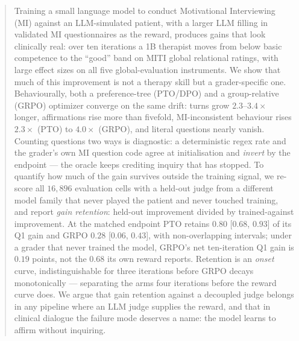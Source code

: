 \begin{abstract}
Training a small language model to conduct Motivational Interviewing (MI) against an
LLM-simulated patient, with a larger LLM filling in validated MI questionnaires as the
reward, produces gains that look clinically real: over ten iterations a 1B therapist moves
from below basic competence to the ``good'' band on MITI global relational ratings, with
large effect sizes on all five global-evaluation instruments. We show that much of this
improvement is not a therapy skill but a grader-specific one. Behaviourally, both a
preference-tree (PTO/DPO) and a group-relative (GRPO) optimizer converge on the same drift:
turns grow $2.3$--$3.4\times$ longer, affirmations rise more than fivefold, MI-inconsistent
behaviour rises $2.3\times$ (PTO) to $4.0\times$ (GRPO), and literal questions nearly vanish.
Counting questions two ways is diagnostic: a deterministic regex rate and the grader's own MI
question code agree at initialisation and \emph{invert} by the endpoint --- the oracle keeps
crediting inquiry that has stopped. To
quantify how much of the gain survives outside the training signal, we re-score all
$16{,}896$ evaluation cells with a held-out judge from a different model family that never
played the patient and never touched training, and report \emph{gain retention}: held-out
improvement divided by trained-against improvement. At the matched endpoint PTO retains
$0.80$ [$0.68$, $0.93$] of its Q1 gain and GRPO $0.28$ [$0.06$, $0.43$], with non-overlapping
intervals; under a grader that never trained the model, GRPO's net ten-iteration Q1 gain is
$0.19$ points, not the $0.68$ its own reward reports. Retention is an \emph{onset} curve,
indistinguishable for three iterations before GRPO decays monotonically --- separating the
arms four iterations before the reward curve does. We argue that gain retention against a
decoupled judge belongs in any pipeline where an LLM judge supplies the reward, and that in
clinical dialogue the failure mode deserves a name: the model learns to affirm without
inquiring.
\end{abstract}
